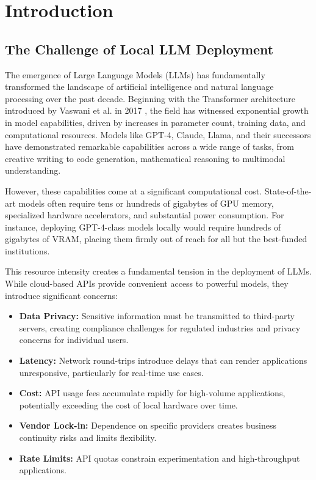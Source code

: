\section{Introduction}
\label{sec:introduction}

\subsection{The Challenge of Local LLM Deployment}

The emergence of Large Language Models (LLMs) has fundamentally transformed the landscape of artificial intelligence and natural language processing over the past decade. Beginning with the Transformer architecture introduced by Vaswani et al. in 2017 \cite{vaswani2017attention}, the field has witnessed exponential growth in model capabilities, driven by increases in parameter count, training data, and computational resources. Models like GPT-4, Claude, Llama, and their successors have demonstrated remarkable capabilities across a wide range of tasks, from creative writing to code generation, mathematical reasoning to multimodal understanding.

However, these capabilities come at a significant computational cost. State-of-the-art models often require tens or hundreds of gigabytes of GPU memory, specialized hardware accelerators, and substantial power consumption. For instance, deploying GPT-4-class models locally would require hundreds of gigabytes of VRAM, placing them firmly out of reach for all but the best-funded institutions.

This resource intensity creates a fundamental tension in the deployment of LLMs. While cloud-based APIs provide convenient access to powerful models, they introduce significant concerns:

\begin{itemize}
    \item \textbf{Data Privacy:} Sensitive information must be transmitted to third-party servers, creating compliance challenges for regulated industries and privacy concerns for individual users.
    \item \textbf{Latency:} Network round-trips introduce delays that can render applications unresponsive, particularly for real-time use cases.
    \item \textbf{Cost:} API usage fees accumulate rapidly for high-volume applications, potentially exceeding the cost of local hardware over time.
    \item \textbf{Vendor Lock-in:} Dependence on specific providers creates business continuity risks and limits flexibility.
    \item \textbf{Rate Limits:} API quotas constrain experimentation and high-throughput applications.
\end{itemize}

